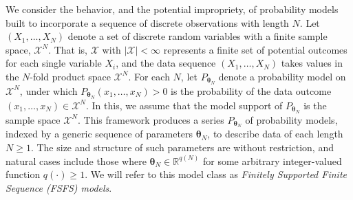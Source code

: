 \documentclass[12pt]{article}
\theoremstyle{definition}
\begin{document}
We consider the behavior, and the potential impropriety, of probability
models built to incorporate a sequence of discrete observations with
length \(N\). Let \((X_1, \dots, X_N)\) denote a set of discrete random
variables with a finite sample space, \(\mathcal{X}^N\). That is,
\(\mathcal{X}\) with \(|\mathcal{X}| < \infty\) represents a finite set
of potential outcomes for each single variable \(X_i\), and the data
sequence \((X_1,\ldots,X_N)\) takes values in the \(N\)-fold product
space \(\mathcal{X}^N\). For each \(N\), let
\(P_{\boldsymbol \theta_N}\) denote a probability model on
\(\mathcal{X}^N\), under which
\(P_{\boldsymbol \theta_N}(x_1, \dots, x_N) > 0\) is the probability of
the data outcome \((x_1, \dots, x_N) \in \mathcal{X}^N\). In this, we
assume that the model support of \(P_{\boldsymbol \theta_N}\) is the
sample space \(\mathcal{X}^N\). This framework produces a series
\(P_{\boldsymbol \theta_N}\) of probability models, indexed by a generic
sequence of parameters \(\boldsymbol \theta_N\), to describe data of
each length \(N \geq 1\). The size and structure of such parameters are
without restriction, and natural cases include those where
\(\boldsymbol \theta_N \in \mathbb{R}^{q(N)}\) for some arbitrary
integer-valued function \(q(\cdot) \geq 1\). We will refer to this model
class as \emph{Finitely Supported Finite Sequence (FSFS) models}.
\end{document}
